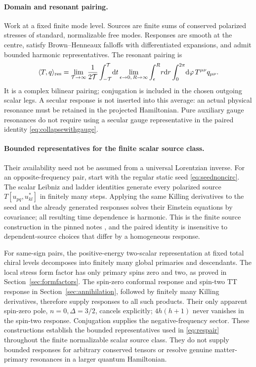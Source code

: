 \documentclass[11pt,a4paper]{article}
\numberwithin{equation}{section}
\theoremstyle{remark}\newtheorem{remark}[theorem]{Remark}
\newcommand{\dd}{\mathrm d}
\begin{document}
\paragraph{Domain and resonant pairing.}
Work at a fixed finite mode level. Sources are finite sums of conserved polarized stresses of standard, normalizable free modes. Responses are smooth at the centre, satisfy Brown--Henneaux falloffs with differentiated expansions, and admit bounded harmonic representatives. The resonant pairing is
\begin{equation}
 \langle T,q\rangle_{\rm res}
 =\lim_{\mathcal T\to\infty}\frac1{2\mathcal T}
 \int_{-\mathcal T}^{\mathcal T}\!\dd t
 \lim_{\epsilon\to0,\,R\to\infty}
 \int_\epsilon^R\!r\dd r\int_0^{2\pi}\!\dd\varphi\,
 T^{\mu\nu}q_{\mu\nu}.
 \label{eq:respair}
\end{equation}
It is a complex bilinear pairing; conjugation is included in the chosen outgoing scalar legs. A secular response is not inserted into this average: an actual physical resonance must be retained in the projected Hamiltonian. Pure auxiliary gauge resonances do not require using a secular gauge representative in the paired identity \eqref{eq:collapsewithgauge}.


\paragraph{Bounded representatives for the finite scalar source class.}
Their availability need not be assumed from a universal Lorentzian inverse. For an opposite-frequency pair, start with the regular static seed \eqref{eq:seednoncirc}. The scalar Leibniz and ladder identities generate every polarized source $T[u_{pq},u_{kl}^*]$ in finitely many steps. Applying the same Killing derivatives to the seed and the already generated responses solves their Einstein equations by covariance; all resulting time dependence is harmonic. This is the finite source construction in the pinned notes \cite{notes}, and the paired identity is insensitive to dependent-source choices that differ by a homogeneous response.

For same-sign pairs, the positive-energy two-scalar representation at fixed total chiral levels decomposes into finitely many global primaries and descendants. The local stress form factor has only primary spins zero and two, as proved in Section~\ref{sec:formfactors}. The spin-zero conformal response and spin-two TT response in Section~\ref{sec:annihilation}, followed by finitely many Killing derivatives, therefore supply responses to all such products. Their only apparent spin-zero pole, $n=0,\Delta=3/2$, cancels explicitly; $4h(h+1)$ never vanishes in the spin-two response. Conjugation supplies the negative-frequency sector. These constructions establish the bounded representatives used in \eqref{eq:respair} throughout the finite normalizable scalar source class. They do not supply bounded responses for arbitrary conserved tensors or resolve genuine matter-primary resonances in a larger quantum Hamiltonian.
\end{document}
